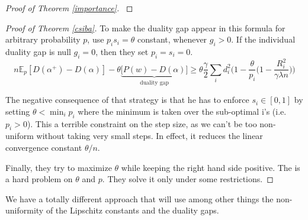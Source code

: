 \documentclass{article}
\DeclareMathOperator{\1}{\mathbb{1}}
\begin{document}
\begin{proof}[Proof of Theorem \ref{importance}]
	\cite{richtarik}
\end{proof}

\begin{proof}[Proof of Theorem \ref{csiba}]
To make the duality gap appear in this formula for arbitrary probability $p$, \cite{csiba2015stochastic} use $p_i s_i = \theta$ constant, whenever $g_i > 0$. 
If the individual duality gap is null $g_i=0$, then they set $p_i=s_i=0$.
\begin{equation}
	n \mathbb E_p[D(\alpha^+) - D(\alpha)] - \theta \underbrace{ \big [ P(w) - D(\alpha) \big ] }_{ \textrm{duality gap}} 
	\geq \theta \frac{\gamma}{2} \sum_i  d_i^2\bigg ( 1 -  \frac{\theta}{p_i} \big ( 1 - \frac{R_i^2}{\gamma \lambda n} \big ) \bigg )
\end{equation}

The negative consequence of that strategy is that he has to enforce $s_i \in [0,1]$ by setting $\theta < \min_i p_i$ where the minimum is taken over the sub-optimal i's (i.e. $p_i>0$).
This a terrible constraint on the step size, as we can't be too non-uniform without taking very small steps.
In effect, it reduces the linear convergence constant $\theta /n$.

Finally, they try to maximize $\theta$ while keeping the right hand side positive.
The is a hard problem on $\theta$ and $p$.
They  solve it only under some restrictions.
\end{proof}

We have a totally different approach that will use among other things the non-uniformity of the Lipschitz constants and the duality gaps.
\end{document}
